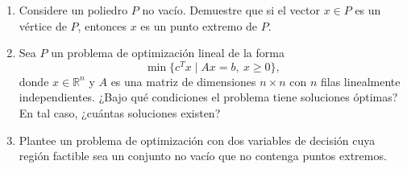 \begin{enumerate}
     \item Considere un poliedro $P$ no vac\'io. Demuestre que si el vector $x\in P$ es un v\'ertice de $P$, entonces $x$ es un punto extremo de $P$.

     \item Sea $P$ un problema de optimizaci\'on lineal de la forma
\[
\min\{c^Tx\mid Ax=b,\ x\ge 0\},
\]
donde $x\in\mathbb{R}^n$ y $A$ es una matriz de dimensiones $n\times n$ con $n$ filas linealmente independientes. ¿Bajo qu\'e condiciones el problema tiene soluciones óptimas? En tal caso, ¿cu\'antas soluciones existen?

    \item Plantee un problema de optimizaci\'on con dos variables de decisi\'on cuya regi\'on factible sea un conjunto no vac\'io que no contenga puntos extremos.

\end{enumerate}
